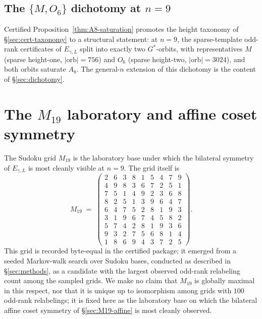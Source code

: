 \documentclass[11pt,a4paper]{article}
\theoremstyle{definition}
\theoremstyle{remark}
\newcommand{\Egamma}{E_{\gamma,L}}
\begin{document}
\subsection{\texorpdfstring{The $\{M, O_6\}$ dichotomy at $n = 9$}{The M/O6 dichotomy at n=9}}\label{sec:dichotomy-n9}

Certified Proposition~\ref{thm:A8-saturation} promotes the height taxonomy of
\S\ref{sec:cert-taxonomy} to a structural statement: at $n = 9$, the
sparse-template odd-rank certificates of $\Egamma$ split into exactly
two $G^*$-orbits, with representatives $M$ (sparse height-one,
$|\mathrm{orb}| = 756$) and $O_6$ (sparse height-two, $|\mathrm{orb}| =
3024$), and both orbits saturate $A_8$. The general-$n$ extension of
this dichotomy is the content of \S\ref{sec:dichotomy}.

\section{\texorpdfstring{The $M_{19}$ laboratory and affine coset symmetry}{The M19 laboratory and affine coset symmetry}}\label{sec:M19}

The Sudoku grid $M_{19}$ is the laboratory base under which the
bilateral symmetry of $\Egamma$ is most cleanly visible at $n = 9$.
The grid itself is
\begin{equation}\label{eq:M19-grid}
   M_{19} \;=\;
   \begin{pmatrix}
      2 & 6 & 3 & 8 & 1 & 5 & 4 & 7 & 9 \\
      4 & 9 & 8 & 3 & 6 & 7 & 2 & 5 & 1 \\
      7 & 5 & 1 & 4 & 9 & 2 & 3 & 6 & 8 \\
      8 & 2 & 5 & 1 & 3 & 9 & 6 & 4 & 7 \\
      6 & 4 & 7 & 5 & 2 & 8 & 1 & 9 & 3 \\
      3 & 1 & 9 & 6 & 7 & 4 & 5 & 8 & 2 \\
      5 & 7 & 4 & 2 & 8 & 1 & 9 & 3 & 6 \\
      9 & 3 & 2 & 7 & 5 & 6 & 8 & 1 & 4 \\
      1 & 8 & 6 & 9 & 4 & 3 & 7 & 2 & 5
   \end{pmatrix}.
\end{equation}
This grid is recorded byte-equal in the certified package; it
emerged from a seeded Markov-walk search over Sudoku bases, conducted
as described in \S\ref{sec:methods}, as a candidate with the
largest observed odd-rank relabeling count among the sampled grids.
We make no claim that $M_{19}$ is globally maximal in this respect,
nor that it is unique up to isomorphism among grids with $100$
odd-rank relabelings; it is fixed here as the laboratory base on
which the bilateral affine coset symmetry of \S\ref{sec:M19-affine} is
most cleanly observed.
\end{document}
